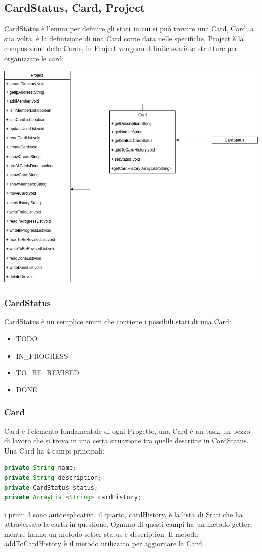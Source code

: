 \documentclass[]{article}
\begin{document}
\subsection{CardStatus, Card, Project}
CardStatus è l'enum per definire gli stati in cui si può trovare una Card, Card, a sua volta, è la definizione di una Card come data nelle specifiche, Project è la composizione delle Cards, in Project vengono definite svariate strutture per organizzare le card.
\begin{center}
	\includegraphics[width=1\textwidth]{architecture}
\end{center}
\subsubsection{CardStatus}
CardStatus è un semplice enum che contiene i possibili stati di una Card:
\begin{itemize}
	\item TODO
	\item IN\_PROGRESS
	\item TO\_BE\_REVISED
	\item DONE
\end{itemize}
\subsubsection{Card}
Card è l'elemento fondamentale di ogni Progetto, una Card è un task, un pezzo di lavoro che si trova in una certa situazione tra quelle descritte in CardStatus. Una Card ha 4 campi principali: 
\begin{lstlisting}[language=java]
private String name;
private String description;
private CardStatus status;
private ArrayList<String> cardHistory;
\end{lstlisting}
i primi 3 sono autoesplicativi, il quarto, cardHistory, è la lista di Stati che ha attraversato la carta in questione.
Ognuno di questi campi ha un metodo getter, mentre hanno un metodo setter status e description. Il metodo addToCardHistory è il metodo utilizzato per aggiornare la Card.
\end{document}
